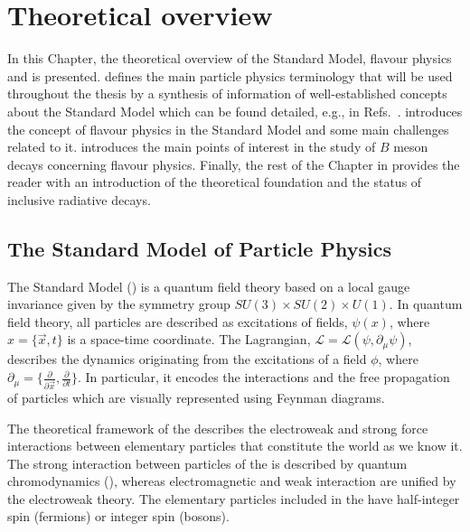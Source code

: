 \chapter{Theoretical overview}\label{ch:theory}

In this Chapter, the theoretical overview of the Standard Model, 
flavour physics and \BtoXsgamma is presented.
 defines the main particle physics terminology that will be used throughout the thesis by a synthesis of 
information of well-established concepts about the Standard Model which can be found detailed, e.g., in Refs.~\cite{Peskin:1995ev,Thomson:2013zua,Griffiths:2008zz}.
 introduces the concept of flavour physics in the Standard Model and some main challenges related to it.
 introduces the main points of interest in the study of $B$ meson decays concerning flavour physics.
Finally, the rest of the Chapter in  provides the reader with an introduction of the theoretical foundation and the status of inclusive radiative decays.


\section{The Standard Model of Particle Physics} \label{sec:standard_model}

The Standard Model (\SM) is a quantum field theory based on a local gauge invariance given by the symmetry group $SU(3)\times SU(2)\times U(1)$.
In quantum field theory, all particles are described as excitations of fields, $\psi(x)$, 
where $x=\{\vec{x},t\}$ is a space-time coordinate.
The Lagrangian, $\mathcal{L}=\mathcal{L}(\psi,\partial_{\mu}\psi)$, describes the dynamics originating from the excitations of a field $\phi$,
where $\partial_{\mu}=\{\frac{\partial}{\partial \vec{x}},\frac{\partial}{\partial t}\}$.
In particular, it encodes the interactions and the free propagation of particles which are visually represented using Feynman diagrams.


The theoretical framework of the \SM describes the electroweak and strong force interactions between elementary particles that constitute the world as we know it.
The strong interaction between particles of the \SM is described by quantum chromodynamics (\QCD), 
whereas electromagnetic and weak interaction are unified by the electroweak theory.
The elementary particles included in the \SM have half-integer spin (fermions) or integer spin (bosons).


